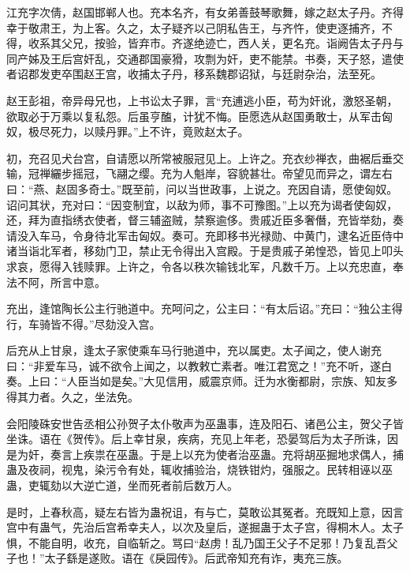 \documentclass[12pt,UTF8]{ctexbook}
\begin{document}
江充字次倩，赵国邯郸人也。充本名齐，有女弟善鼓琴歌舞，嫁之赵太子丹。齐得幸于敬肃王，为上客。久之，太子疑齐以己阴私告王，与齐忤，使吏逐捕齐，不得，收系其父兄，按验，皆弃市。齐遂绝迹亡，西人关，更名充。诣阙告太子丹与同产姊及王后宫奸乱，交通郡国豪猾，攻剽为奸，吏不能禁。书奏，天子怒，遣使者诏郡发吏卒围赵王宫，收捕太子丹，移系魏郡诏狱，与廷尉杂治，法至死。



赵王彭祖，帝异母兄也，上书讼太子罪，言“充逋逃小臣，苟为奸讹，激怒圣朝，欲取必于万乘以复私怨。后虽亨醢，计犹不悔。臣愿选从赵国勇敢士，从军击匈奴，极尽死力，以赎丹罪。”上不许，竟败赵太子。



初，充召见犬台宫，自请愿以所常被服冠见上。上许之。充衣纱禅衣，曲裾后垂交输，冠禅纚步摇冠，飞翮之缨。充为人魁岸，容貌甚壮。帝望见而异之，谓左右曰：“燕、赵固多奇士。”既至前，问以当世政事，上说之。充因自请，愿使匈奴。诏问其状，充对曰：“因变制宜，以敌为师，事不可豫图。”上以充为谒者使匈奴，还，拜为直指绣衣使者，督三辅盗贼，禁察逾侈。贵戚近臣多奢僭，充皆举劾，奏请没入车马，令身待北军击匈奴。奏可。充即移书光禄勋、中黄门，逮名近臣侍中诸当诣北军者，移劾门卫，禁止无令得出入宫殿。于是贵戚子弟惶恐，皆见上叩头求哀，愿得入钱赎罪。上许之，令各以秩次输钱北军，凡数千万。上以充忠直，奉法不阿，所言中意。



充出，逢馆陶长公主行驰道中。充呵问之，公主曰：“有太后诏。”充曰：“独公主得行，车骑皆不得。”尽劾没入宫。



后充从上甘泉，逢太子家使乘车马行驰道中，充以属吏。太子闻之，使人谢充曰：“非爱车马，诚不欲令上闻之，以教敕亡素者。唯江君宽之！”充不听，遂白奏。上曰：“人臣当如是矣。”大见信用，威震京师。迁为水衡都尉，宗族、知友多得其力者。久之，坐法免。



会阳陵硃安世告丞相公孙贺子太仆敬声为巫蛊事，连及阳石、诸邑公主，贺父子皆坐诛。语在《贺传》。后上幸甘泉，疾病，充见上年老，恐晏驾后为太子所诛，因是为奸，奏言上疾祟在巫蛊。于是上以充为使者治巫蛊。充将胡巫掘地求偶人，捕蛊及夜祠，视鬼，染污令有处，辄收捕验治，烧铁钳灼，强服之。民转相诬以巫蛊，吏辄劾以大逆亡道，坐而死者前后数万人。



是时，上春秋高，疑左右皆为蛊祝诅，有与亡，莫敢讼其冤者。充既知上意，因言宫中有蛊气，先治后宫希幸夫人，以次及皇后，遂掘蛊于太子宫，得桐木人。太子惧，不能自明，收充，自临斩之。骂曰“赵虏！乱乃国王父子不足邪！乃复乱吾父子也！”太子繇是遂败。语在《戾园传》。后武帝知充有诈，夷充三族。
\end{document}
